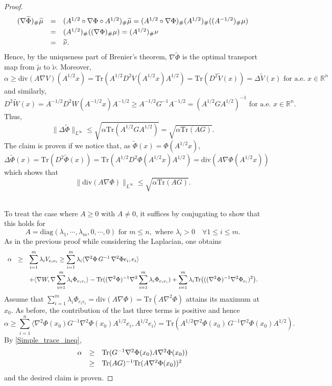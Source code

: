 \documentclass[11pt,a4paper,reqno]{amsart}
\numberwithin{equation}{section}
\theoremstyle{definition}
\newcommand{\nm}{\noalign{\smallskip}}
\newcommand{\ds}{\displaystyle}
\renewcommand{\tilde}{\widetilde}
\newcommand{\<}{\ensuremath \leq}
\renewcommand{\>}{\ensuremath \geq}
\renewcommand{\tilde}{\widetilde}
\begin{document}
\begin{proof}
$$\begin{array}{lll}
(\nabla \tilde \Phi)_{\#}\tilde \mu &=& (A^{1/2} \circ \nabla \Phi \circ A^{1/2})_{\#}\tilde \mu=(A^{1/2} \circ \nabla \Phi)_{\#}(A^{1/2})_{\#}((A^{-1/2})_{\#}\mu) \\
\nm 
&=& (A^{1/2})_{\#}((\nabla \Phi)_{\#}\mu)=(A^{1/2})_{\#}\nu \\
\nm 
&=& \tilde \nu.
\end{array}$$ Hence, by the uniqueness part of Brenier's theorem, $\nabla \tilde \Phi$ is the optimal transport map from $\tilde \mu$ to $\tilde \nu.$ Moreover, $$\alpha \geq \mathrm{div}(A\nabla V)(A^{1/2}x)=\mathrm{Tr}(A^{1/2}D^2V(A^{1/2}x)A^{1/2})=\mathrm{Tr}(D^2 \tilde V(x))=\Delta \tilde V(x) \text{ for a.e. } x \in \mathbb{R}^n$$ and similarly, $$D^2 \tilde W(x)=A^{-1/2}D^2W(A^{-1/2}x)A^{-1/2} \geq A^{-1/2}G^{-1}A^{-1/2}=(A^{1/2}GA^{1/2})^{-1} \text{ for a.e. } x \in \mathbb{R}^n.$$ Thus, $$\|\Delta \tilde \Phi\|_{L^\infty} \leq \sqrt{\alpha \mathrm{Tr}(A^{1/2}GA^{1/2})}=\sqrt{\alpha \mathrm{Tr}(AG)}.$$ The claim is proven if we notice that, as $\tilde \Phi(x)=\Phi(A^{1/2}x)$, $$\Delta \tilde \Phi(x)=\mathrm{Tr}(D^2\tilde \Phi(x))=\mathrm{Tr}(A^{1/2}D^2\Phi(A^{1/2}x)A^{1/2})=\mathrm{div}(A\nabla \Phi(A^{1/2}x))$$ which shows that $$\|\mathrm{div}(A\nabla \Phi)\|_{L^\infty} \leq \sqrt{\alpha \mathrm{Tr}(AG)}.$$  


\hfill \\ To treat the case where $A \geq 0$ with $A \neq 0$, it suffices by conjugating to show that this holds for $$A=\mathrm{diag}(\lambda_1,\cdots,\lambda_m,0,\cdots,0) \text{ for } m \leq n, \text{ where } \lambda_i>0 \quad \forall 1 \leq i \leq m.$$ As in the previous proof while considering the Laplacian, one obtains $$\begin{array}{lll} \alpha &\geq& \ds \sum_{i=1}^m \lambda_i V_{e_i e_i} \geq \sum_{i=1}^m \lambda_i \langle \nabla^2 \Phi \, G^{-1}\, \nabla^2 \Phi e_i,e_i\rangle \\ 
\nm 
&& \ds +\langle \nabla W, \nabla \sum_{i=1}^m \lambda_i \Phi_{e_ie_i} \rangle-\mathrm{Tr}((\nabla^2 \Phi)^{-1}\nabla^2 \sum_{i=1}^m \lambda_i \Phi_{e_ie_i})+\sum_{i=1}^m \lambda_i \mathrm{Tr}\bigl(( (\nabla^2 \Phi)^{-1}\nabla^2 \Phi_{e_i})^2\bigl).
\end{array}$$ Assume that $\sum_{i=1}^m \lambda_i \Phi_{e_ie_i}=\mathrm{div}(A \nabla \Phi)=\mathrm{Tr}(A \nabla^2 \Phi)$ attains its maximum at $x_0.$ As before, the contribution of the last three terms is positive and hence $$\alpha \geq \sum_{i=1}^n \langle \nabla^2 \Phi(x_0) G^{-1}\nabla^2\Phi(x_0) A^{1/2}e_i,A^{1/2}e_i\rangle=\mathrm{Tr}(A^{1/2}\nabla^2 \Phi(x_0) \, G^{-1}\nabla^2 \Phi(x_0) A^{1/2}).$$ 
By \cref{Simple_trace_ineq}, $$\begin{array}{lll}
\alpha &\geq& \mathrm{Tr}(G^{-1}\nabla^2 \Phi(x_0)A\nabla^2\Phi(x_0)) \\
\nm 
&\geq& \mathrm{Tr}(AG)^{-1}\mathrm{Tr}(A\nabla^2 \Phi(x_0))^2
\end{array}$$ and the desired claim is proven. 
\end{proof}
\end{document}
